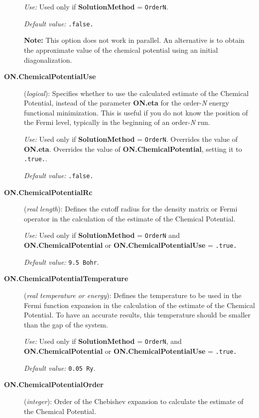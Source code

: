 \documentclass[11pt]{article}
\begin{document}
\begin{description}
{\it Use:} Used only if {\bf SolutionMethod} = {\tt OrderN}.

{\it Default value:} {\tt .false.}

{\bf Note:} This option does not work in parallel. An alternative
is to obtain the approximate value of the chemical potential using
an initial diagonalization.


\item[{\bf ON.ChemicalPotentialUse}] ({\it logical}):
Specifies whether to use the calculated estimate of the
Chemical Potential, instead of the parameter
{\bf ON.eta}
for the order-{\it N} energy functional minimization.
This is useful if you do not know the position
of the Fermi level, typically in the beginning
of an order-{\em N} run.

{\it Use:} Used only if {\bf SolutionMethod} = {\tt OrderN}.
Overrides the value of {\bf ON.eta}.
Overrides the value of {\bf ON.ChemicalPotential}, setting
it to {\tt .true.}.

{\it Default value:} {\tt .false.}

\item[{\bf ON.ChemicalPotentialRc}]  ({\it real length}):
Defines the cutoff radius for the density matrix or Fermi
operator in the calculation of the estimate of the
Chemical Potential.

{\it Use:} Used only if {\bf SolutionMethod} = {\tt OrderN}
and {\bf ON.ChemicalPotential} or  {\bf ON.ChemicalPotentialUse}
= {\tt .true.}

{\it Default value:} {\tt 9.5 Bohr}.

\item[{\bf ON.ChemicalPotentialTemperature}]  ({\it real temperature
or energy}):
Defines the temperature to be used in the Fermi function expansion
in the calculation of the estimate of the Chemical Potential.
To have an accurate results, this temperature should be smaller
than the gap of the system.

{\it Use:} Used only if {\bf SolutionMethod} = {\tt OrderN},
and {\bf ON.ChemicalPotential} or  {\bf ON.ChemicalPotentialUse} =
{\tt .true.}

{\it Default value:} {\tt 0.05 Ry}.

\item[{\bf ON.ChemicalPotentialOrder}] ({\it integer}):
Order of the Chebishev expansion to calculate the estimate
of the Chemical Potential.


\end{description}
\end{document}
